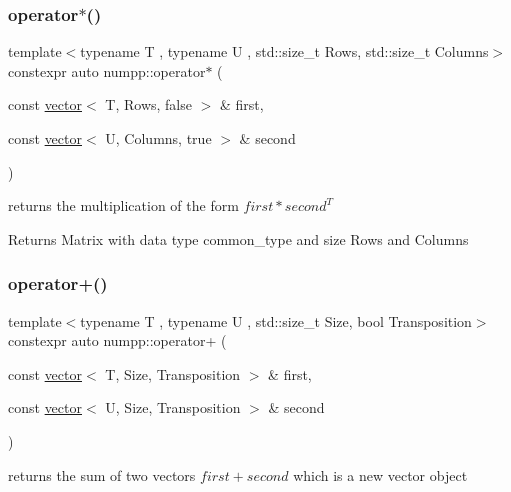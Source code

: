 \subsubsection{\texorpdfstring{operator$\ast$()}{operator*()}\hspace{0.1cm}{\footnotesize\ttfamily [5/5]}}
{\footnotesize\ttfamily template$<$typename T , typename U , std\+::size\+\_\+t Rows, std\+::size\+\_\+t Columns$>$ \\
constexpr auto numpp\+::operator$\ast$ (\begin{DoxyParamCaption}\item[{const \hyperlink{classnumpp_1_1vector}{vector}$<$ T, Rows, false $>$ \&}]{first,  }\item[{const \hyperlink{classnumpp_1_1vector}{vector}$<$ U, Columns, true $>$ \&}]{second }\end{DoxyParamCaption})}

returns the multiplication of the form $first*second^T$ \begin{DoxyReturn}{Returns}
Matrix with data type common\+\_\+type and size Rows and Columns
\end{DoxyReturn}
\mbox{\label{group__numpp__structures__vector_ga3942b8e2790d5d9b328632be6cf4aeb4}} 
\subsubsection{\texorpdfstring{operator+()}{operator+()}}
{\footnotesize\ttfamily template$<$typename T , typename U , std\+::size\+\_\+t Size, bool Transposition$>$ \\
constexpr auto numpp\+::operator+ (\begin{DoxyParamCaption}\item[{const \hyperlink{classnumpp_1_1vector}{vector}$<$ T, Size, Transposition $>$ \&}]{first,  }\item[{const \hyperlink{classnumpp_1_1vector}{vector}$<$ U, Size, Transposition $>$ \&}]{second }\end{DoxyParamCaption})}

returns the sum of two vectors $first+second$ which is a new vector object\mbox{\label{group__numpp__structures__vector_gaed4254f0627625649e3db732b6ff7f76}} 
